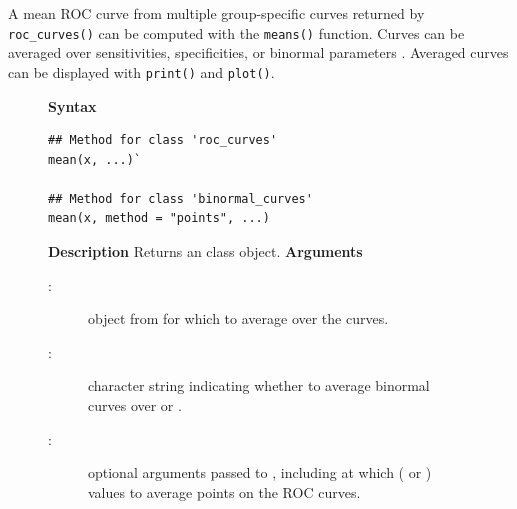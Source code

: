 \documentclass[
]{jss}
\newenvironment{Description}{\textbf{Description}\vspace{0.5em}\newline}{\vspace{0.5em}\newline}
\begin{document}
A mean ROC curve from multiple group-specific curves returned by
\texttt{roc\_curves()} can be computed with the \texttt{means()}
function. Curves can be averaged over sensitivities, specificities, or
binormal parameters \citep{Chen:2014:ARO}. Averaged curves can be
displayed with \texttt{print()} and \texttt{plot()}.

\begin{figure}[h]
\begin{tcolorbox}[title=ROC Means Function]
\textbf{Syntax}
\begin{verbatim}
## Method for class 'roc_curves'
mean(x, ...)`

## Method for class 'binormal_curves'
mean(x, method = "points", ...)
\end{verbatim}
\begin{Description}
Returns an  class object.
\end{Description}
\textbf{Arguments}
\begin{description}
\item[:] object from  for which to average over the curves.
\item[:] character string indicating whether to average binormal curves over  or .
\item[:] optional arguments passed to , including at which  ( or ) values to average points on the ROC curves.
\end{description}
\end{tcolorbox}
\end{figure}
\end{document}
